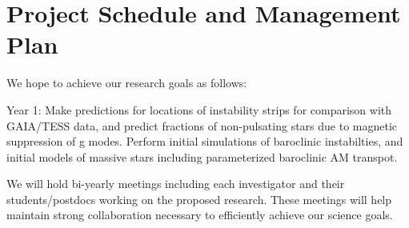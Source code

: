 \section{Project Schedule and Management Plan}

We hope to achieve our research goals as follows:

Year 1: Make predictions for locations of instability strips for comparison with GAIA/TESS data, and predict fractions of non-pulsating stars due to magnetic suppression of g modes. Perform initial simulations of baroclinic instabilties, and initial models of massive stars including parameterized baroclinic AM transpot.  

We will  hold bi-yearly meetings including each investigator and their students/postdocs working on the proposed research. These meetings will help maintain strong collaboration necessary to efficiently achieve our science goals.

